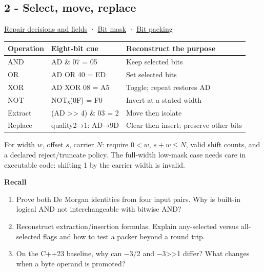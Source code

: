 \subsection{2 - Select, move, replace}\label{appendix-ef4d27797a92-select-move-replace}

\hypertarget{appendix-ef4d27797a92-select-move-replace}{}

\hyperref[01-foundations-i-ch001-bits-become-decisions-and-compact-fields]{Repair decisions and fields} · \hyperref[appendix-dbe5905163c2]{Bit mask} · \hyperref[appendix-1f9963e1a5d1]{Bit packing}


{\def\LTcaptype{none} %
\begin{longtable}[]{@{}lll@{}}
\toprule\noalign{}
Operation & Eight-bit cue & Reconstruct the purpose \\
\midrule\noalign{}
\endhead
\bottomrule\noalign{}
\endlastfoot
AND & AD \& 07 = 05 & Keep selected bits \\
OR & AD OR 40 = ED & Set selected bits \\
XOR & AD XOR 08 = A5 & Toggle; repeat restores AD \\
NOT & NOT₈(0F) = F0 & Invert at a stated width \\
Extract & (AD \textgreater\textgreater{} 4) \& 03 = 2 & Move then isolate \\
Replace & quality2→1: AD→9D & Clear then insert; preserve other bits \\
\end{longtable}
}

For width \(w\), offset \(s\), carrier \(N\): require \(0<w\), \(s+w\le N\), valid shift counts, and a declared reject/truncate policy. The full-width low-mask case needs care in executable code: shifting 1 by the carrier width is invalid.

\textbf{Recall}

\begin{enumerate}
\def\labelenumi{\arabic{enumi}.}
\setcounter{enumi}{3}
\tightlist
\item
  Prove both De Morgan identities from four input pairs. Why is built-in logical AND not interchangeable with bitwise AND?
\item
  Reconstruct extraction/insertion formulas. Explain any-selected versus all-selected flags and how to test a packer beyond a round trip.
\item
  On the C++23 baseline, why can −3/2 and −3\textgreater\textgreater1 differ? What changes when a byte operand is promoted?
\end{enumerate}

